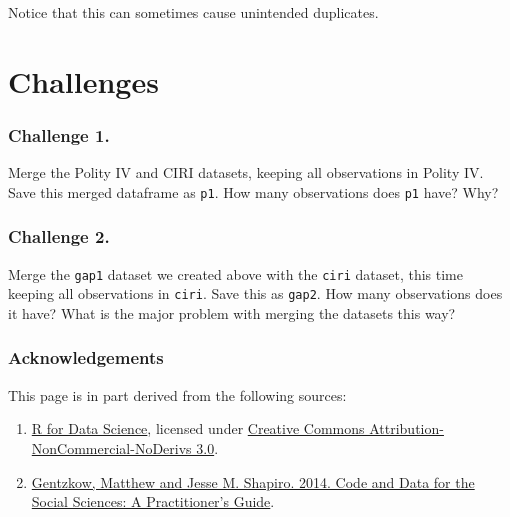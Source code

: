\documentclass[
]{book}
\begin{document}
Notice that this can sometimes cause unintended duplicates.

\hypertarget{challenges-8}{%
\section{Challenges}\label{challenges-8}}

\hypertarget{challenge-1.-5}{%
\subsubsection*{Challenge 1.}\label{challenge-1.-5}}

Merge the Polity IV and CIRI datasets, keeping all observations in Polity IV. Save this merged dataframe as \texttt{p1}. How many observations does \texttt{p1} have? Why?

\hypertarget{challenge-2.-4}{%
\subsubsection*{Challenge 2.}\label{challenge-2.-4}}

Merge the \texttt{gap1} dataset we created above with the \texttt{ciri} dataset, this time keeping all observations in \texttt{ciri}. Save this as \texttt{gap2}. How many observations does it have? What is the major problem with merging the datasets this way?

\hypertarget{acknowledgements-1}{%
\subsubsection*{Acknowledgements}\label{acknowledgements-1}}

This page is in part derived from the following sources:

\begin{enumerate}
\def\labelenumi{\arabic{enumi}.}
\item
  \href{https://r4ds.had.co.nz}{R for Data Science}, licensed under \href{https://creativecommons.org/licenses/by-nc-nd/3.0/us/}{Creative Commons Attribution-NonCommercial-NoDerivs 3.0}.
\item
  \href{https://web.stanford.edu/~gentzkow/research/CodeAndData.pdf}{Gentzkow, Matthew and Jesse M. Shapiro. 2014. Code and Data for the Social Sciences: A Practitioner's Guide}.
\end{enumerate}
\end{document}
